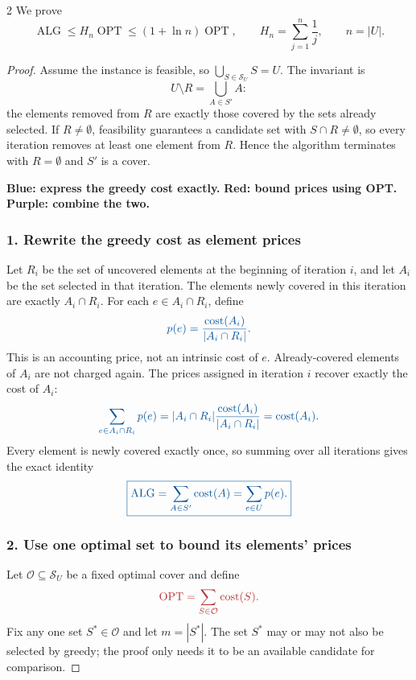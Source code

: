 \documentclass[10pt]{article}
\theoremstyle{definition}
\newcommand{\OPT}{\operatorname{OPT}}
\newcommand{\ALG}{\operatorname{ALG}}
\begin{document}
\begin{multicols*}{2}
We prove
\[
  \ALG\leq H_n\OPT\leq(1+\ln n)\OPT,
  \qquad
  H_n=\sum_{j=1}^{n}\frac1j,\qquad n=|U|.
\]

\begin{proof}
Assume the instance is feasible, so
$\bigcup_{S\in\mathcal{S}_U}S=U$. The invariant is
\[
  U\setminus R=\bigcup_{A\in S'}A:
\]
the elements removed from $R$ are exactly those covered by the sets already
selected. If $R\neq\emptyset$, feasibility guarantees a candidate set with
$S\cap R\neq\emptyset$, so every iteration removes at least one element from
$R$. Hence the algorithm terminates with $R=\emptyset$ and $S'$ is a cover.

\medskip
\noindent
\textcolor{algblue}{\textbf{Blue: express the greedy cost exactly.}}\quad
\textcolor{optred}{\textbf{Red: bound prices using OPT.}}\quad
\textcolor{bridgepurple}{\textbf{Purple: combine the two.}}

\subsubsection*{\textcolor{algblue}{1. Rewrite the greedy cost as element prices}}

Let $R_i$ be the set of uncovered elements at the beginning of iteration $i$,
and let $A_i$ be the set selected in that iteration. The elements newly
covered in this iteration are exactly $A_i\cap R_i$. For each
$e\in A_i\cap R_i$, define
\[
  \color{algblue}
  p(e)=\frac{\operatorname{cost}(A_i)}{|A_i\cap R_i|}.
\]
This is an accounting price, not an intrinsic cost of $e$. Already-covered
elements of $A_i$ are not charged again. The prices assigned in iteration
$i$ recover exactly the cost of $A_i$:
\[
  \color{algblue}
  \sum_{e\in A_i\cap R_i}p(e)
  =|A_i\cap R_i|\frac{\operatorname{cost}(A_i)}{|A_i\cap R_i|}
  =\operatorname{cost}(A_i).
\]
Every element is newly covered exactly once, so summing over all iterations
gives the exact identity
\[
  \color{algblue}
  \boxed{\ALG=\sum_{A\in S'}\operatorname{cost}(A)
  =\sum_{e\in U}p(e).}
\]

\subsubsection*{\textcolor{optred}{2. Use one optimal set to bound its elements' prices}}

Let $\mathcal{O}\subseteq\mathcal{S}_U$ be a fixed optimal cover and define
\[
  \color{optred}
  \OPT=\sum_{S\in\mathcal{O}}\operatorname{cost}(S).
\]
Fix any one set $S^*\in\mathcal{O}$ and let $m=|S^*|$. The set $S^*$ may or
may not also be selected by greedy; the proof only needs it to be an available
candidate for comparison.


\end{proof}
\end{multicols*}
\end{document}
